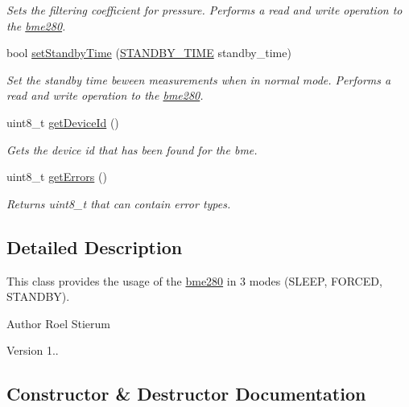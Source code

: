 \begin{DoxyCompactItemize}
\begin{DoxyCompactList}\small\item\em Sets the filtering coefficient for pressure. Performs a read and write operation to the \hyperlink{classbme280}{bme280}. \end{DoxyCompactList}\item 
bool \hyperlink{classbme280_ab88f4e002affd59867caeb4037944140}{set\+Standby\+Time} (\hyperlink{bme280_8hpp_a2db4a9862b3a2e31301ac185385d2520}{S\+T\+A\+N\+D\+B\+Y\+\_\+\+T\+I\+ME} standby\+\_\+time)
\begin{DoxyCompactList}\small\item\em Set the standby time beween measurements when in normal mode. Performs a read and write operation to the \hyperlink{classbme280}{bme280}. \end{DoxyCompactList}\item 
uint8\+\_\+t \hyperlink{classbme280_a486ed59e9eea42e0375628c67e2ed66b}{get\+Device\+Id} ()
\begin{DoxyCompactList}\small\item\em Gets the device id that has been found for the bme. \end{DoxyCompactList}\item 
uint8\+\_\+t \hyperlink{classbme280_a61798b4e47639700c577e512d990a60a}{get\+Errors} ()
\begin{DoxyCompactList}\small\item\em Returns uint8\+\_\+t that can contain error types. \end{DoxyCompactList}\end{DoxyCompactItemize}


\subsection{Detailed Description}
This class provides the usage of the \hyperlink{classbme280}{bme280} in 3 modes (S\+L\+E\+EP, F\+O\+R\+C\+ED, S\+T\+A\+N\+D\+BY). 

\begin{DoxyAuthor}{Author}
Roel Stierum 
\end{DoxyAuthor}
\begin{DoxyVersion}{Version}
1.. 
\end{DoxyVersion}


\subsection{Constructor \& Destructor Documentation}
\mbox{\label{classbme280_a03080355d94cce45ee931426c8d19a08}} 
